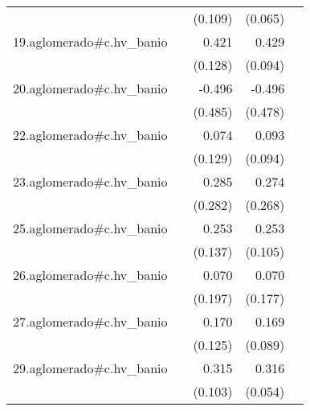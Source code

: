 {\begin{longtable}{l*{4}{D{.}{.}{-1}}}
            &                     &     (0.109)         &     (0.065)         &                     \\
\addlinespace
19.aglomerado#c.hv\_banio&                     &       0.421\sym{**} &       0.429\sym{***}&                     \\
            &                     &     (0.128)         &     (0.094)         &                     \\
\addlinespace
20.aglomerado#c.hv\_banio&                     &      -0.496         &      -0.496         &                     \\
            &                     &     (0.485)         &     (0.478)         &                     \\
\addlinespace
22.aglomerado#c.hv\_banio&                     &       0.074         &       0.093         &                     \\
            &                     &     (0.129)         &     (0.094)         &                     \\
\addlinespace
23.aglomerado#c.hv\_banio&                     &       0.285         &       0.274         &                     \\
            &                     &     (0.282)         &     (0.268)         &                     \\
\addlinespace
25.aglomerado#c.hv\_banio&                     &       0.253         &       0.253\sym{*}  &                     \\
            &                     &     (0.137)         &     (0.105)         &                     \\
\addlinespace
26.aglomerado#c.hv\_banio&                     &       0.070         &       0.070         &                     \\
            &                     &     (0.197)         &     (0.177)         &                     \\
\addlinespace
27.aglomerado#c.hv\_banio&                     &       0.170         &       0.169         &                     \\
            &                     &     (0.125)         &     (0.089)         &                     \\
\addlinespace
29.aglomerado#c.hv\_banio&                     &       0.315\sym{**} &       0.316\sym{***}&                     \\
            &                     &     (0.103)         &     (0.054)         &                     \\

\end{longtable}}
